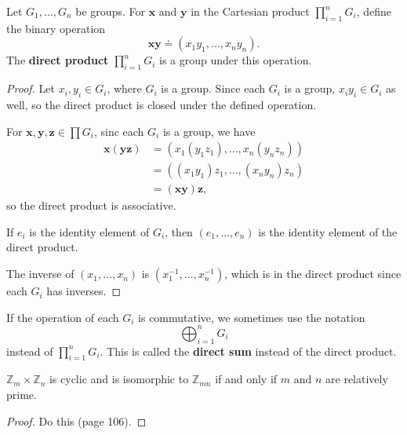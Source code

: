 \documentclass[10pt]{report}
\begin{document}
\begin{thrm}{}{}
Let $G_1, \dots, G_n$ be groups. For $\mathbf{x}$ and $\mathbf{y}$ in the Cartesian product $\prod_{i=1}^n G_i$, define the binary operation
\[
	\mathbf{x}\mathbf{y} \doteq (x_1y_1, \dots, x_n y_n).
\] The \textbf{direct product} $\prod_{i=1}^n G_i$ is a group under this operation.
\end{thrm}
\begin{proof}
	Let $x_i, y_i \in G_i$, where $G_i$ is a group. Since each $G_i$ is a group, $x_i y_i \in G_i$ as well, so the direct product is closed under the defined operation.

	For $\mathbf{x},\mathbf{y},\mathbf{z} \in \prod G_i$, sinc each $G_i$ is a group, we have
	\begin{align*}
		\mathbf{x}(\mathbf{y}\mathbf{z}) &= (x_1(y_1z_1), \dots, x_n(y_n z_n)) \\
						 &= ( (x_1y_1)z_1, \dots, (x_n y_n)z_n) \\
						 &= (\mathbf{x}\mathbf{y})\mathbf{z},
	\end{align*}
	so the direct product is associative.

	If $e_i$ is the identity element of $G_i$, then $(e_1, \dots, e_n)$ is the identity element of the direct product.

	The inverse of $(x_1, \dots, x_n)$ is $(x_1^{-1}, \dots, x_n^{-1})$, which is in the direct product since each $G_i$ has inverses.
\end{proof}

\begin{note}{}{}
	If the operation of each $G_i$ is commutative, we sometimes use the notation \[\bigoplus_{i=1}^n G_i\] instead of $\prod_{i=1}^n G_i$. This is called the \textbf{direct sum} instead of the direct product.
\end{note}

\begin{thrm}{}{}
$\mathbb{Z}_m \times \mathbb{Z}_n$ is cyclic and is isomorphic to $\mathbb{Z}_{mn}$ if and only if $m$ and $n$ are relatively prime.
\end{thrm}
\begin{proof}
	{\color{red}Do this (page 106).}
\end{proof}
\end{document}
